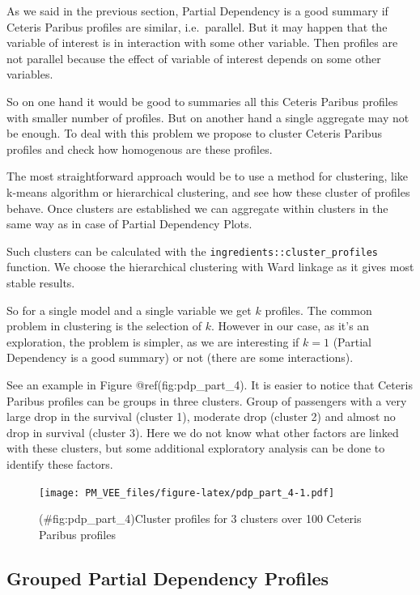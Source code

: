 \documentclass[12pt,]{krantz}
\begin{document}
As we said in the previous section, Partial Dependency is a good summary if Ceteris Paribus profiles are similar, i.e.~parallel. But it may happen that the variable of interest is in interaction with some other variable. Then profiles are not parallel because the effect of variable of interest depends on some other variables.

So on one hand it would be good to summaries all this Ceteris Paribus profiles with smaller number of profiles. But on another hand a single aggregate may not be enough.
To deal with this problem we propose to cluster Ceteris Paribus profiles and check how homogenous are these profiles.

The most straightforward approach would be to use a method for clustering, like k-means algorithm or hierarchical clustering, and see how these cluster of profiles behave. Once clusters are established we can aggregate within clusters in the same way as in case of Partial Dependency Plots.

Such clusters can be calculated with the \texttt{ingredients::cluster\_profiles} function. We choose the hierarchical clustering with Ward linkage as it gives most stable results.

So for a single model and a single variable we get \(k\) profiles. The common problem in clustering is the selection of \(k\). However in our case, as it's an exploration, the problem is simpler, as we are interesting if \(k=1\) (Partial Dependency is a good summary) or not (there are some interactions).

See an example in Figure @ref(fig:pdp\_part\_4). It is easier to notice that Ceteris Paribus profiles can be groups in three clusters. Group of passengers with a very large drop in the survival (cluster 1), moderate drop (cluster 2) and almost no drop in survival (cluster 3). Here we do not know what other factors are linked with these clusters, but some additional exploratory analysis can be done to identify these factors.

\begin{figure}
\centering
\texttt{[image: PM\_VEE\_files/figure-latex/pdp\_part\_4-1.pdf]}
\caption{(\#fig:pdp\_part\_4)Cluster profiles for 3 clusters over 100 Ceteris Paribus profiles}
\end{figure}

\hypertarget{grouped-partial-dependency-profiles}{%
\subsection{Grouped Partial Dependency Profiles}\label{grouped-partial-dependency-profiles}}
\end{document}
